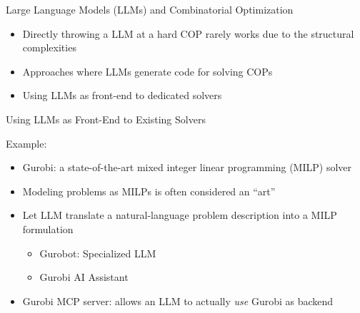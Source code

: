 \documentclass[aspectratio=1610]{beamer}
\newcommand{\important}[1]{{\color{green!60!black}#1}}
\begin{document}
\begin{frame}{Large Language Models (LLMs) and Combinatorial Optimization}
	\begin{itemize}
		\itemsep4ex
		\item Directly throwing a LLM at a hard COP rarely works due to the structural complexities
		\item Approaches where LLMs generate code for solving COPs 
		\item Using LLMs as front-end to dedicated solvers
	\end{itemize}
\end{frame}

\begin{frame}{Using LLMs as Front-End to Existing Solvers}

Example:

\bigskip
\begin{itemize}
	\itemsep2ex
	\item \important{Gurobi}: a state-of-the-art mixed integer linear programming (MILP) solver
	\item Modeling problems as MILPs is often considered an ``art''
	\item Let LLM translate a natural-language problem description into a MILP formulation
	\begin{itemize}
		\item Gurobot: Specialized LLM
		\item Gurobi AI Assistant
	\end{itemize}
	\item Gurobi MCP server: allows an LLM to actually \emph{use} Gurobi as backend
\end{itemize}

\begin{center}
\end{center}
\end{frame}
\end{document}
